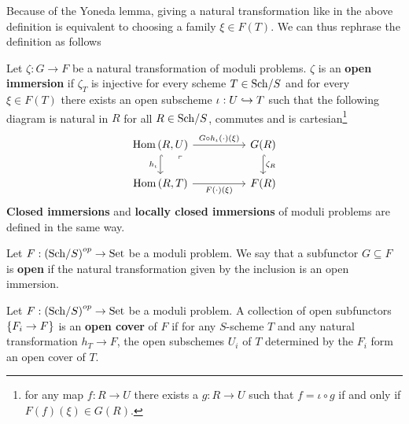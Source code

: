 Because of the Yoneda lemma, giving a natural transformation like in the above definition is equivalent to choosing a family $\xi\in F(T)$. We can thus rephrase the definition as follows

\begin{definition}
Let $\zeta:G\to F$ be a natural transformation of moduli problems. $\zeta$ is an \textbf{open immersion} if $\zeta_T$ is injective for every scheme $T\in{\mathrm{Sch}}/{S}$ and for every $\xi\in F(T)$ there exists an open subscheme $\iota:U\hookrightarrow T$ such that the following diagram is natural in $R$ for all $R\in {\mathrm{Sch}}/{S}$, commutes and is cartesian\footnote{for any map $f:R\to U$ there exists a $g:R\to U$ such that $f=\iota\circ g$ if and only if $F(f)(\xi)\in G(R)$.}
\[\begin{tikzcd}
	{\Hom(R,U)} && {G(R)} \\
	{\Hom(R,T)} && {F(R)}
	\arrow["{G\circ h_\iota(\cdot)(\xi)}", from=1-1, to=1-3]
	\arrow["{h_\iota}"', hook, from=1-1, to=2-1]
	\arrow["{\zeta_R}", hook, from=1-3, to=2-3]
	\arrow[""{name=0, anchor=center, inner sep=0}, "{F(\cdot)(\xi)}"', from=2-1, to=2-3]
	\arrow["\ulcorner"{anchor=center, pos=0.125}, draw=none, from=1-1, to=0]
\end{tikzcd}\]
\textbf{Closed immersions} and \textbf{locally closed immersions} of moduli problems are defined in the same way.
\end{definition}


\begin{definition}
Let $F:\left({\mathrm{Sch}}/{S}\right)^{op}\to \mathrm{Set}$ be a moduli problem. We say that a subfunctor $G\subseteq F$ is \textbf{open} if the natural transformation given by the inclusion is an open immersion.
\end{definition}

\begin{definition}
Let $F:\left({\mathrm{Sch}}/{S}\right)^{op}\to \mathrm{Set}$ be a moduli problem. A collection of open subfunctors $\left\{{F_i\to F}\right\}$ is an \textbf{open cover} of $F$ if for any $S$-scheme $T$ and any natural transformation $h_T\to F$, the open subschemes $U_i$ of $T$ determined by the $F_i$ form an open cover of $T$.
\end{definition}



